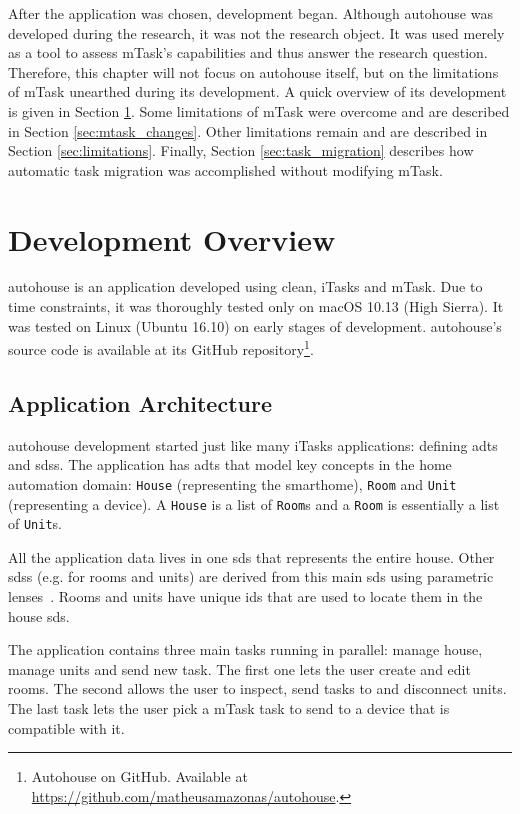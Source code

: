 After the application was chosen, development began. Although \gls{autohouse} was developed during the research, it was not the research object. It was used merely as a tool to assess \gls{mTask}'s capabilities and thus answer the research question. Therefore, this chapter will not focus on \gls{autohouse} itself, but on the limitations of \gls{mTask} unearthed during its development. A quick overview of its development is given in Section \ref{sec:dev_overview}. Some limitations of \gls{mTask} were overcome and are described in Section \ref{sec:mtask_changes}. Other limitations remain and are described in Section \ref{sec:limitations}. Finally, Section \ref{sec:task_migration} describes how automatic task migration was accomplished without modifying \gls{mTask}.

\section{Development Overview}\label{sec:dev_overview}
\gls{autohouse} is an application developed using \gls{clean}, \gls{iTasks} and \gls{mTask}. Due to time constraints, it was thoroughly tested only on macOS 10.13 (High Sierra). It was tested on Linux (Ubuntu 16.10) on early stages of development. \gls{autohouse}'s source code is available at its GitHub repository\footnote{Autohouse on GitHub. Available at \url{https://github.com/matheusamazonas/autohouse}.}.

\subsection{Application Architecture}
\gls{autohouse} development started just like many \gls{iTasks} applications: defining \acsp{adt} and \acsp{sds}. The application has \acsp{adt} that model key concepts in the home automation domain: \texttt{House} (representing the smarthome), \texttt{Room} and \texttt{Unit} (representing a device). A \texttt{House} is a list of \texttt{Room}s and a \texttt{Room} is essentially a list of \texttt{Unit}s. 

All the application data lives in one \acs{sds} that represents the entire house. Other \acsp{sds} (e.g. for rooms and units) are derived from this main \acs{sds} using parametric lenses~\cite{parametric}. Rooms and units have unique ids that are used to locate them in the house \acs{sds}. 

The application contains three main tasks running in parallel: manage house, manage units and send new task. The first one lets the user create and edit rooms. The second allows the user to inspect, send tasks to and disconnect units. The last task lets the user pick a \gls{mTask} task to send to a device that is compatible with it.

